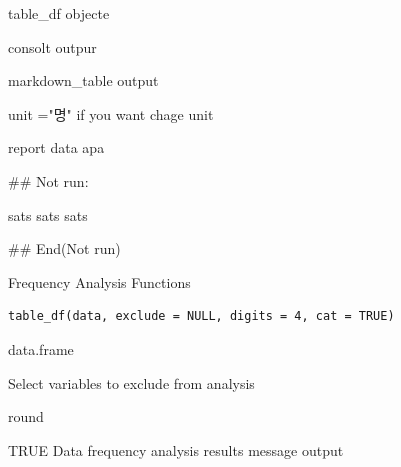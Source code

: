\documentclass[a4paper]{book}
\begin{document}
%
\begin{Arguments}
\begin{ldescription}
\item[\code{data}] table\_df objecte

\item[\code{print}] consolt outpur

\item[\code{md}] markdown\_table output

\item[\code{unit}] unit ="명" if you want chage unit
\end{ldescription}
\end{Arguments}
%
\begin{Value}
report data apa
\end{Value}
%
\begin{Examples}
\begin{ExampleCode}

## Not run: 

sats %
sats %
sats %

## End(Not run)

\end{ExampleCode}
\end{Examples}
%
\begin{Description}
Frequency Analysis Functions
\end{Description}
%
\begin{Usage}
\begin{verbatim}
table_df(data, exclude = NULL, digits = 4, cat = TRUE)
\end{verbatim}
\end{Usage}
%
\begin{Arguments}
\begin{ldescription}
\item[\code{data}] data.frame

\item[\code{exclude}] Select variables to exclude from analysis

\item[\code{digits}] round

\item[\code{cat}] TRUE Data frequency analysis results message output
\end{ldescription}
\end{Arguments}
\end{document}
